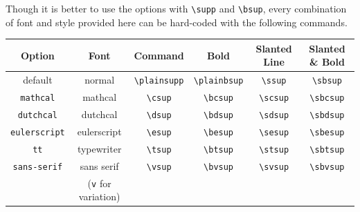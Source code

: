 \documentclass{article}
\begin{document}
Though it is better to use the options with \texttt{\textbackslash supp} and \texttt{\textbackslash bsup}, every combination of font and style provided here can be hard-coded with the following commands. 
\begin{center}
    \begin{tabular}{|c|c|c|c|c|c|}
        \hline
        \textbf{Option} & \textbf{Font} & \textbf{Command} & \textbf{Bold} & \textbf{Slanted Line} & \textbf{Slanted \& Bold} \\ \hline\hline
        default & normal & \texttt{\textbackslash plainsupp} & \texttt{\textbackslash plainbsup} & \texttt{\textbackslash ssup}  & \texttt{\textbackslash sbsup}  \\ \hline
        \texttt{mathcal} & mathcal & \texttt{\textbackslash csup} & \texttt{\textbackslash bcsup} & \texttt{\textbackslash scsup} & \texttt{\textbackslash sbcsup}  \\ \hline
        \texttt{dutchcal} & dutchcal & \texttt{\textbackslash dsup} & \texttt{\textbackslash bdsup} & \texttt{\textbackslash sdsup} & \texttt{\textbackslash sbdsup}  \\ \hline
        \texttt{eulerscript} & eulerscript & \texttt{\textbackslash esup} & \texttt{\textbackslash besup}  & \texttt{\textbackslash sesup}  & \texttt{\textbackslash sbesup}  \\ \hline
        \texttt{tt} & typewriter & \texttt{\textbackslash tsup} & \texttt{\textbackslash btsup} & \texttt{\textbackslash stsup} & \texttt{\textbackslash sbtsup}  \\ \hline
        \texttt{sans-serif} & sans serif & \texttt{\textbackslash vsup} & \texttt{\textbackslash bvsup} & \texttt{\textbackslash svsup} & \texttt{\textbackslash sbvsup}  \\
        &(\texttt{v} for variation) & & & & \\ \hline
    \end{tabular}
\end{center}
\end{document}
